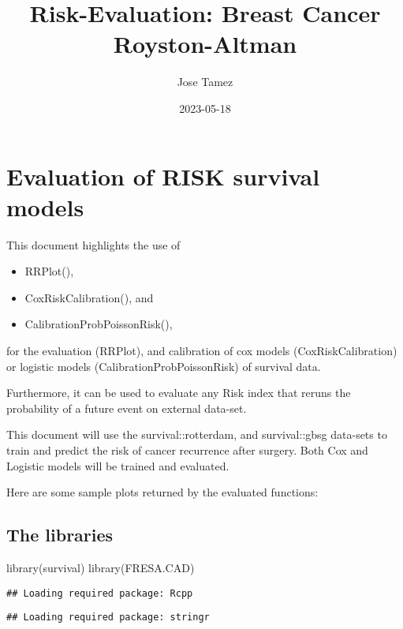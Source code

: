 \documentclass[
]{article}
\title{Risk-Evaluation: Breast Cancer Royston-Altman}
\author{Jose Tamez}
\date{2023-05-18}
\newenvironment{Shaded}{\begin{snugshade}}{\end{snugshade}}
\newcommand{\FunctionTok}[1]{\textcolor[rgb]{0.00,0.00,0.00}{#1}}
\newcommand{\NormalTok}[1]{#1}
\begin{document}
\maketitle

{
\setcounter{tocdepth}{2}
\tableofcontents
}
\hypertarget{evaluation-of-risk-survival-models}{%
\section{Evaluation of RISK survival
models}\label{evaluation-of-risk-survival-models}}

This document highlights the use of

\begin{itemize}
\item
  RRPlot(),
\item
  CoxRiskCalibration(), and
\item
  CalibrationProbPoissonRisk(),
\end{itemize}

for the evaluation (RRPlot), and calibration of cox models
(CoxRiskCalibration) or logistic models (CalibrationProbPoissonRisk) of
survival data.

Furthermore, it can be used to evaluate any Risk index that reruns the
probability of a future event on external data-set.

This document will use the survival::rotterdam, and survival::gbsg
data-sets to train and predict the risk of cancer recurrence after
surgery. Both Cox and Logistic models will be trained and evaluated.

Here are some sample plots returned by the evaluated functions:

\hypertarget{the-libraries}{%
\subsection{The libraries}\label{the-libraries}}

\begin{Shaded}
\begin{Highlighting}[]
\FunctionTok{library}\NormalTok{(survival)}
\FunctionTok{library}\NormalTok{(FRESA.CAD)}
\end{Highlighting}
\end{Shaded}

\begin{verbatim}
## Loading required package: Rcpp
\end{verbatim}

\begin{verbatim}
## Loading required package: stringr
\end{verbatim}
\end{document}

